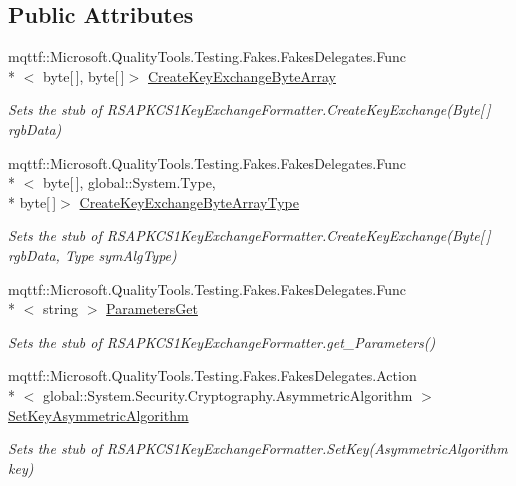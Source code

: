 \subsection*{Public Attributes}
\begin{DoxyCompactItemize}
\item 
mqttf\-::\-Microsoft.\-Quality\-Tools.\-Testing.\-Fakes.\-Fakes\-Delegates.\-Func\\*
$<$ byte\mbox{[}$\,$\mbox{]}, byte\mbox{[}$\,$\mbox{]}$>$ \hyperlink{class_system_1_1_security_1_1_cryptography_1_1_fakes_1_1_stub_r_s_a_p_k_c_s1_key_exchange_formatter_a1369fb1a97826f2b2348cc444fd46331}{Create\-Key\-Exchange\-Byte\-Array}
\begin{DoxyCompactList}\small\item\em Sets the stub of R\-S\-A\-P\-K\-C\-S1\-Key\-Exchange\-Formatter.\-Create\-Key\-Exchange(\-Byte\mbox{[}$\,$\mbox{]} rgb\-Data)\end{DoxyCompactList}\item 
mqttf\-::\-Microsoft.\-Quality\-Tools.\-Testing.\-Fakes.\-Fakes\-Delegates.\-Func\\*
$<$ byte\mbox{[}$\,$\mbox{]}, global\-::\-System.\-Type, \\*
byte\mbox{[}$\,$\mbox{]}$>$ \hyperlink{class_system_1_1_security_1_1_cryptography_1_1_fakes_1_1_stub_r_s_a_p_k_c_s1_key_exchange_formatter_a5edce8c97ee3e76314b930c2913ebe55}{Create\-Key\-Exchange\-Byte\-Array\-Type}
\begin{DoxyCompactList}\small\item\em Sets the stub of R\-S\-A\-P\-K\-C\-S1\-Key\-Exchange\-Formatter.\-Create\-Key\-Exchange(\-Byte\mbox{[}$\,$\mbox{]} rgb\-Data, Type sym\-Alg\-Type)\end{DoxyCompactList}\item 
mqttf\-::\-Microsoft.\-Quality\-Tools.\-Testing.\-Fakes.\-Fakes\-Delegates.\-Func\\*
$<$ string $>$ \hyperlink{class_system_1_1_security_1_1_cryptography_1_1_fakes_1_1_stub_r_s_a_p_k_c_s1_key_exchange_formatter_a44958985d404f2121c09420d719a1639}{Parameters\-Get}
\begin{DoxyCompactList}\small\item\em Sets the stub of R\-S\-A\-P\-K\-C\-S1\-Key\-Exchange\-Formatter.\-get\-\_\-\-Parameters()\end{DoxyCompactList}\item 
mqttf\-::\-Microsoft.\-Quality\-Tools.\-Testing.\-Fakes.\-Fakes\-Delegates.\-Action\\*
$<$ global\-::\-System.\-Security.\-Cryptography.\-Asymmetric\-Algorithm $>$ \hyperlink{class_system_1_1_security_1_1_cryptography_1_1_fakes_1_1_stub_r_s_a_p_k_c_s1_key_exchange_formatter_a5520e3d67dd1a4b97ec9c7d69cd53327}{Set\-Key\-Asymmetric\-Algorithm}
\begin{DoxyCompactList}\small\item\em Sets the stub of R\-S\-A\-P\-K\-C\-S1\-Key\-Exchange\-Formatter.\-Set\-Key(\-Asymmetric\-Algorithm key)\end{DoxyCompactList}\end{DoxyCompactItemize}
